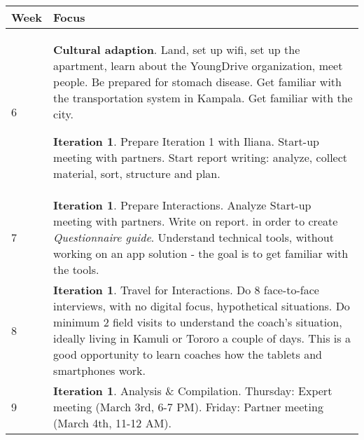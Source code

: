\begin{center}
    \begin{tabular}{ | l | p{10cm} |}
    \hline
    Week & Focus \\ \hline
    6 & \textbf{Cultural adaption}. Land, set up wifi, set up the apartment, learn about the YoungDrive organization, meet people. Be prepared for stomach disease. Get familiar with the transportation system in Kampala. Get familiar with the city.

    \textbf{Iteration 1}. Prepare Iteration 1 with Iliana. %
    Start-up meeting with partners. %
    Start report writing: analyze, collect material, sort, structure and plan.
    \\ \hline
    7 & \textbf{Iteration 1}. Prepare Interactions. Analyze Start-up meeting with partners. Write on report. %
    in order to create \textit{Questionnaire guide}. Understand technical tools, without working on an app solution - the goal is to get familiar with the tools. %
    \\ \hline
    8 & \textbf{Iteration 1}. Travel for Interactions. Do 8 face-to-face interviews, with no digital focus, hypothetical situations. Do minimum 2 field visits to understand the coach's situation, ideally living in Kamuli or Tororo a couple of days. This is a good opportunity to learn coaches how the tablets and smartphones work.  \\ \hline %

    9 & \textbf{Iteration 1}. Analysis \& Compilation. Thursday: Expert meeting (March 3rd, 6-7 PM). Friday: Partner meeting (March 4th, 11-12 AM).


\end{tabular}
\end{center}
